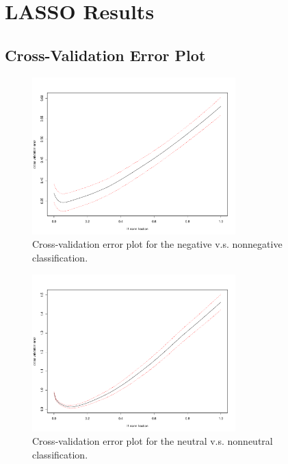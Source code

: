 \documentclass[11pt]{article}
\newcommand{\1}[1]{{\mathbf 1}\left\{#1\right\}}        %
\begin{document}
\clearpage

\newpage
\newpage




\newpage
\appendix

\section{LASSO Results}

\subsection{Cross-Validation Error Plot}\label{asec:cverror}

\begin{center}
\begin{figure}[!h]
   \centering
   \includegraphics[width=0.7\textwidth]{../lassoResults/CVNegErr.pdf} 
      \caption{Cross-validation error plot for the negative v.s. nonnegative classification. }
   \label{fig:cvplotneg}
\end{figure}
\end{center}

\begin{center}
\begin{figure}[!h]
   \centering
   \includegraphics[width=0.7\textwidth]{../lassoResults/CVNeuErr.pdf} 
      \caption{Cross-validation error plot for the neutral v.s. nonneutral classification. }
   \label{fig:cvplotneu}
\end{figure}
\end{center}
\end{document}

